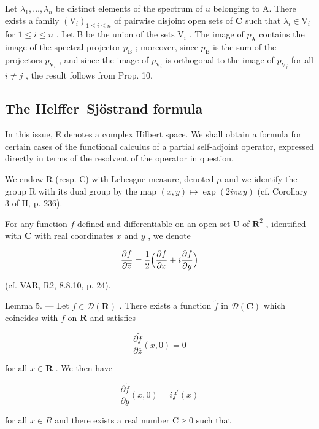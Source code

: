 Let \(\lambda_1, \ldots, \lambda_n\) be distinct elements of the spectrum of \(u\) belonging to A. There exists a family \((\mathrm{V}_i)_{1 \leqslant i \leqslant n}\) of pairwise disjoint open sets of \(\mathbf{C}\) such that \(\lambda_i \in \mathrm{V}_i\) for \(1 \leqslant i \leqslant n\) . Let B be the union of the sets \(\mathrm{V}_i\) . The image of \(p_{\mathrm{A}}\) contains the image of the spectral projector \(p_{\mathrm{B}}\) ; moreover, since \(p_{\mathrm{B}}\) is the sum of the projectors \(p_{\mathrm{V}_i}\) , and since the image of \(p_{\mathrm{V}_i}\) is orthogonal to the image of \(p_{\mathrm{V}_j}\) for all \(i \neq j\) , the result follows from Prop. 10.

\subsection{The Helffer--Sjöstrand formula}

In this issue, E denotes a complex Hilbert space. We shall obtain a formula for certain cases of the functional calculus of a partial self-adjoint operator, expressed directly in terms of the resolvent of the operator in question.

We endow R (resp. C) with Lebesgue measure, denoted \(\mu\) and we identify the group R with its dual group by the map \((x,y)\mapsto\exp(2i\pi xy)\) (cf. Corollary 3 of II, p. 236).

For any function \(f\) defined and differentiable on an open set U of \(\mathbf{R}^{2}\) , identified with \(\mathbf{C}\) with real coordinates \(x\) and \(y\) , we denote

\[
{\frac {\partial f}{\partial \overline {{{z}}}}} = {\frac {1}{2}} {\Bigl (} {\frac {\partial f}{\partial x}} + i {\frac {\partial f}{\partial y}} {\Bigr)}
\]

(cf. VAR, R2, 8.8.10, p. 24).

Lemma 5. --- Let \(f \in \mathcal{D}(\mathbf{R})\) . There exists a function \(\tilde{f}\) in \(\mathcal{D}(\mathbf{C})\) which coincides with \(f\) on \(\mathbf{R}\) and satisfies

\[
\frac {\partial \widetilde {f}}{\partial \overline {{z}}} (x, 0) = 0\tag{11}
\]

for all \(x \in \mathbf{R}\) . We then have

\[
\frac {\partial \widetilde {f}}{\partial y} (x, 0) = i f ^ {\prime} (x)\tag{12}
\]

for all \(x \in R\) and there exists a real number C ≥ 0 such that


